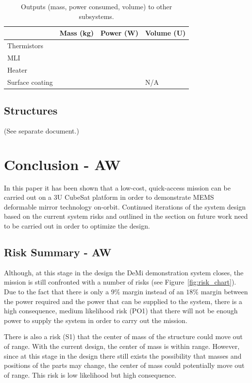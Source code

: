 \documentclass[12pt]{article}
\begin{document}
\begin{table}[ht]%
\centering
\caption{Outputs (mass, power consumed, volume) to other subsystems.}
\label{table:thermal-outputs}
\begin{tabular}{|l|l|l|l|}\hline
& Mass (kg) & Power (W) & Volume (U) \\\hline
Thermistors & & & \\\hline
MLI & & & \\\hline
Heater & & & \\\hline
Surface coating & & & N/A \\\hline

\end{tabular}
\end{table}




		\subsection{Structures}

(See separate document.)

\section{Conclusion - AW}

In this paper it has been shown that a low-cost, quick-access mission can be carried out on a 3U CubeSat platform in order to demonstrate MEMS deformable mirror technology on-orbit.  Continued iterations of the system design based on the current system risks and outlined in the section on future work need to be carried out in order to optimize the design.

		\subsection{Risk Summary - AW}

Although, at this stage in the design the DeMi demonstration system closes, the mission is still confronted with a number of risks (see Figure~\ref{fig:risk_chart}).  Due to the fact that there is only a $9\%$ margin instead of an $18\%$ margin between the power required and the power that can be supplied to the system, there is a high consequence, medium likelihood risk (PO1) that there will not be enough power to supply the system in order to carry out the mission.

There is also a risk (S1) that the center of mass of the structure could move out of range.  With the current design, the center of mass is within range.  However, since at this stage in the design there still exists the possibility that masses and positions of the parts may change, the center of mass could potentially move out of range.  This risk is low likelihood but high consequence.
\end{document}
